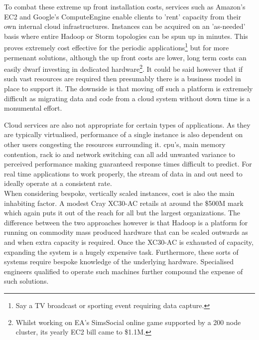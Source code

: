 \documentclass[a4paper,11pt]{scrreprt}
\begin{document}
To combat these extreme up front installation costs, services such as Amazon's EC2 and Google's ComputeEngine enable clients to 'rent' capacity from their own internal cloud infrastructures. Instances can be acquired on an 'as-needed' basis where entire Hadoop or Storm topologies can be spun up in minutes. This proves extremely cost effective for the periodic applications\footnote{Say a TV broadcast or sporting event requiring data capture.} but for more permenant solutions, although the up front costs are lower, long term costs can easily dwarf investing in dedicated hardware\footnote{Whilst working on EA's SimsSocial online game supported by a 200 node cluster, its yearly EC2 bill came to \$1.1M.}. It could be said however that if such vast resources are required then presumably there is a business model in place to support it. The downside is that moving off such a platform is extremely difficult as migrating data and code from a cloud system without down time is a monumental effort.\

Cloud services are also not appropriate for certain types of applications. As they are typically virtualised, performance of a single instance is also dependent on other users congesting the resources surrounding it. \acrshort{cpu}'s, main memory contention, rack \acrshort{io} and network switching can all add unwanted variance to perceived performance making guaranteed response times difficult to predict. For real time applications to work properly, the stream of data in and out need to ideally operate at a consistent rate.\\

When considering bespoke, vertically scaled instances, cost is also the main inhabiting factor. A modest Cray XC30-AC retails at around the \$500M mark which again puts it out of the reach for all but the largest organizations. The difference between the two approaches however is that Hadoop is a platform for running on commodity mass produced hardware that can be scaled outwards as and when extra capacity is required. Once the XC30-AC is exhausted of capacity, expanding the system is a hugely expensive task. Furthermore, these sorts of systems require bespoke knowledge of the underlying hardware. Specialised engineers qualified to operate such machines further compound the expense of such solutions. 
\end{document}

